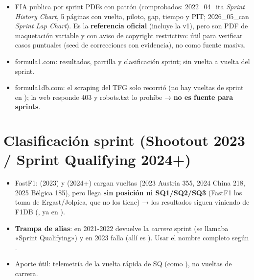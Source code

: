 \begin{itemize}
\item FIA publica por sprint PDFs con patrón  (comprobados: 2022\_04\_ita \emph{Sprint History Chart}, 5 páginas con vuelta, piloto, gap, tiempo y PIT; 2026\_05\_can \emph{Sprint Lap Chart}). Es la \textbf{referencia oficial} (incluye la v1), pero son PDF de maquetación variable y con aviso de copyright restrictivo: útil para verificar casos puntuales (seed de correcciones con evidencia), no como fuente masiva.
\item formula1.com: resultados, parrilla y clasificación sprint; sin vuelta a vuelta del sprint.
\item formula1db.com: el scraping del TFG solo recorrió  (no hay vueltas de sprint en ); la web responde 403 y robots.txt lo prohíbe → \textbf{no es fuente para sprints}.
\end{itemize}

\section{Clasificación sprint (Shootout 2023 / Sprint Qualifying 2024+)}

\begin{itemize}
\item FastF1:  (2023) y  (2024+) cargan vueltas (2023 Austria 355, 2024 China 218, 2025 Bélgica 185), pero  llega \textbf{sin posición ni SQ1/SQ2/SQ3} (FastF1 los toma de Ergast/Jolpica, que no los tiene) → los resultados siguen viniendo de F1DB (, ya en ).
\item \textbf{Trampa de alias}:  en 2021-2022 devuelve la \emph{carrera} sprint (se llamaba «Sprint Qualifying») y en 2023 falla (allí es ). Usar el nombre completo según .
\item Aporte útil: telemetría de la vuelta rápida de SQ (como ), no vueltas de carrera.
\end{itemize}

